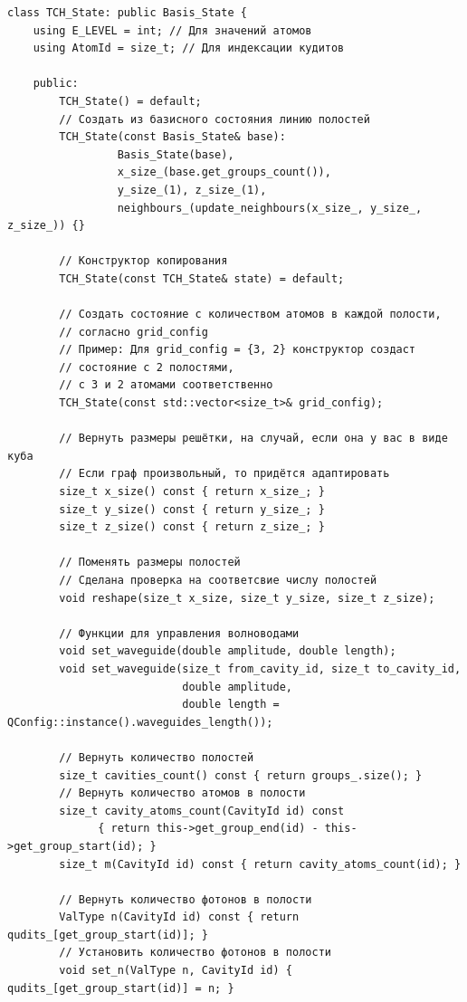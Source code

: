 \documentclass[12pt,fleqn]{article}
\begin{document}
\begin{mdframed}[linecolor=black, topline=true, bottomline=true,
leftline=false, rightline=false]
\begin{verbatim}
class TCH_State: public Basis_State {
    using E_LEVEL = int; // Для значений атомов
    using AtomId = size_t; // Для индексации кудитов

    public:
        TCH_State() = default;
        // Создать из базисного состояния линию полостей
        TCH_State(const Basis_State& base): 
                 Basis_State(base),
                 x_size_(base.get_groups_count()),
                 y_size_(1), z_size_(1),
                 neighbours_(update_neighbours(x_size_, y_size_, z_size_)) {}

        // Конструктор копирования
        TCH_State(const TCH_State& state) = default;

        // Создать состояние с количеством атомов в каждой полости,
        // согласно grid_config
        // Пример: Для grid_config = {3, 2} конструктор создаст
        // состояние с 2 полостями,
        // с 3 и 2 атомами соответственно
        TCH_State(const std::vector<size_t>& grid_config);

        // Вернуть размеры решётки, на случай, если она у вас в виде куба
        // Если граф произвольный, то придётся адаптировать
        size_t x_size() const { return x_size_; }
        size_t y_size() const { return y_size_; }
        size_t z_size() const { return z_size_; }

        // Поменять размеры полостей
        // Сделана проверка на соответсвие числу полостей
        void reshape(size_t x_size, size_t y_size, size_t z_size);

        // Функции для управления волноводами
        void set_waveguide(double amplitude, double length);
        void set_waveguide(size_t from_cavity_id, size_t to_cavity_id,
                           double amplitude,
                           double length = QConfig::instance().waveguides_length());

        // Вернуть количество полостей
        size_t cavities_count() const { return groups_.size(); }
        // Вернуть количество атомов в полости
        size_t cavity_atoms_count(CavityId id) const
              { return this->get_group_end(id) - this->get_group_start(id); }
        size_t m(CavityId id) const { return cavity_atoms_count(id); }

        // Вернуть количество фотонов в полости
        ValType n(CavityId id) const { return qudits_[get_group_start(id)]; }
        // Установить количество фотонов в полости
        void set_n(ValType n, CavityId id) { qudits_[get_group_start(id)] = n; }


\end{verbatim}
\end{mdframed}
\end{document}
